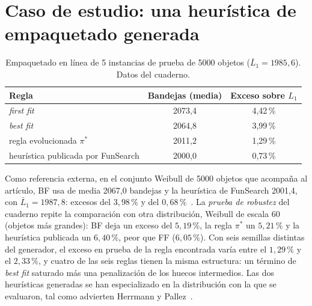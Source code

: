 \section{Caso de estudio: una heurística de empaquetado generada}

\addtocounter{definicion}{1}%

\begin{table}[h]
\centering\small
\caption{Empaquetado en línea de 5 instancias de prueba de 5000 objetos ($\bar L_1=1985{,}6$). Datos del cuaderno.}\label{tab:bp}
\begin{tabular}{@{}lcc@{}}
\toprule
Regla & Bandejas (media) & Exceso sobre $L_1$ \\
\midrule
\emph{first fit} & 2073{,}4 & 4{,}42\,\% \\
\emph{best fit} & 2064{,}8 & 3{,}99\,\% \\
regla evolucionada $\pi^{*}$ & 2011{,}2 & 1{,}29\,\% \\
heurística publicada por FunSearch & 2000{,}0 & 0{,}73\,\% \\
\bottomrule
\end{tabular}
\end{table}

Como referencia externa, en el conjunto Weibull de 5000 objetos que acompaña al artículo, BF usa de media 2067{,}0 bandejas y la heurística de FunSearch 2001{,}4, con $\bar L_1=1987{,}8$: excesos del $3{,}98\,\%$ y del $0{,}68\,\%$~\cite{funsearch-code}. La \emph{prueba de robustez} del cuaderno repite la comparación con otra distribución, Weibull de escala 60 (objetos más grandes): BF deja un exceso del $5{,}19\,\%$, la regla $\pi^{*}$ un $5{,}21\,\%$ y la heurística publicada un $6{,}40\,\%$, peor que FF ($6{,}05\,\%$). Con seis semillas distintas del generador, el exceso en prueba de la regla encontrada varía entre el $1{,}29\,\%$ y el $2{,}33\,\%$, y cuatro de las seis reglas tienen la misma estructura: un término de \emph{best fit} saturado más una penalización de los huecos intermedios. Las dos heurísticas generadas se han especializado en la distribución con la que se evaluaron, tal como advierten Herrmann y Pallez~\cite{hp}.

